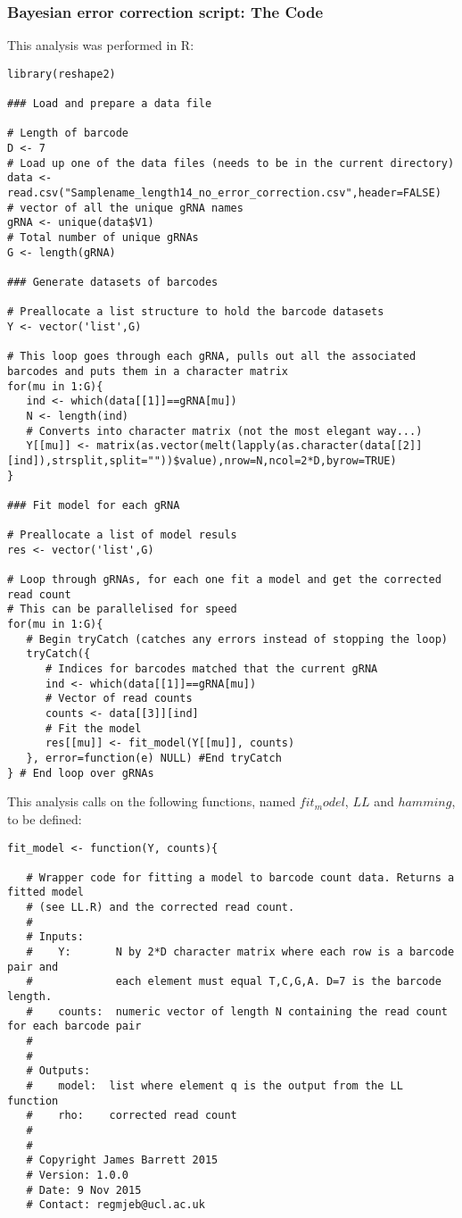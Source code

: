 \begin{footnotesize}
\subsubsection{Bayesian error correction script: The Code}

This analysis was performed in R:

\begin{lstlisting}
library(reshape2)

### Load and prepare a data file

# Length of barcode
D <- 7
# Load up one of the data files (needs to be in the current directory)
data <- read.csv("Samplename_length14_no_error_correction.csv",header=FALSE)
# vector of all the unique gRNA names
gRNA <- unique(data$V1)
# Total number of unique gRNAs
G <- length(gRNA)

### Generate datasets of barcodes

# Preallocate a list structure to hold the barcode datasets
Y <- vector('list',G)

# This loop goes through each gRNA, pulls out all the associated barcodes and puts them in a character matrix
for(mu in 1:G){
   ind <- which(data[[1]]==gRNA[mu])
   N <- length(ind)
   # Converts into character matrix (not the most elegant way...)
   Y[[mu]] <- matrix(as.vector(melt(lapply(as.character(data[[2]][ind]),strsplit,split=""))$value),nrow=N,ncol=2*D,byrow=TRUE)
}

### Fit model for each gRNA

# Preallocate a list of model resuls
res <- vector('list',G)

# Loop through gRNAs, for each one fit a model and get the corrected read count
# This can be parallelised for speed
for(mu in 1:G){
   # Begin tryCatch (catches any errors instead of stopping the loop)
   tryCatch({
      # Indices for barcodes matched that the current gRNA
      ind <- which(data[[1]]==gRNA[mu])
      # Vector of read counts
      counts <- data[[3]][ind]
      # Fit the model
      res[[mu]] <- fit_model(Y[[mu]], counts)
   }, error=function(e) NULL) #End tryCatch
} # End loop over gRNAs
\end{lstlisting}

This analysis calls on the following functions, named $fit_model$, $LL$ and $hamming$, to be defined:

\begin{lstlisting}
fit_model <- function(Y, counts){
   
   # Wrapper code for fitting a model to barcode count data. Returns a fitted model 
   # (see LL.R) and the corrected read count.
   #
   # Inputs:
   #    Y:       N by 2*D character matrix where each row is a barcode pair and 
   #             each element must equal T,C,G,A. D=7 is the barcode length.
   #    counts:  numeric vector of length N containing the read count for each barcode pair
   #    
   #
   # Outputs:
   #    model:  list where element q is the output from the LL function
   #    rho:    corrected read count
   #
   #
   # Copyright James Barrett 2015
   # Version: 1.0.0
   # Date: 9 Nov 2015
   # Contact: regmjeb@ucl.ac.uk
   

\end{lstlisting}
\end{footnotesize}
